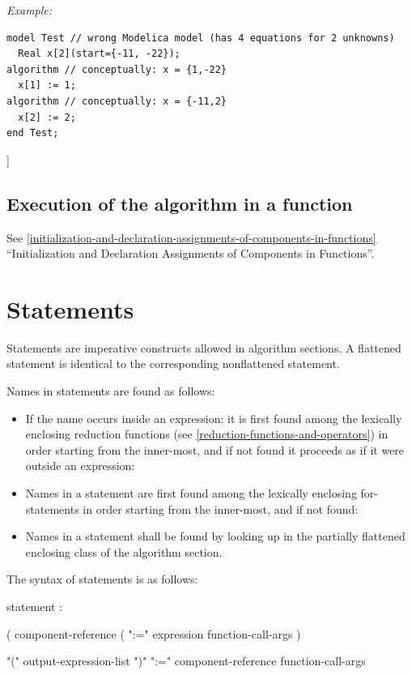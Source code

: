 \documentclass[10pt,a4paper]{report}
\def\doublelabel#1{\label{#1}\hypertarget{#1}{}}
\begin{document}
\emph{Example:}

\begin{lstlisting}[language=modelica]
model Test // wrong Modelica model (has 4 equations for 2 unknowns)
  Real x[2](start={-11, -22});
algorithm // conceptually: x = {1,-22}
  x[1] := 1;
algorithm // conceptually: x = {-11,2}
  x[2] := 2;
end Test;
\end{lstlisting}
{]}

\subsection{Execution of the algorithm in a function}\doublelabel{execution-of-the-algorithm-in-a-function}

See \ref{initialization-and-declaration-assignments-of-components-in-functions} ``Initialization and Declaration Assignments of
Components in Functions''.

\section{Statements}\doublelabel{statements}

Statements are imperative constructs allowed in algorithm sections. A
flattened statement is identical to the corresponding nonflattened
statement.

Names in statements are found as follows:

\begin{itemize}
\item
  If the name occurs inside an expression: it is first found among the
  lexically enclosing reduction functions (see \ref{reduction-functions-and-operators}) in order
  starting from the inner-most, and if not found it proceeds as if it
  were outside an expression:
\item
  Names in a statement are first found among the lexically enclosing
  for-statements in order starting from the inner-most, and if not
  found:
\item
  Names in a statement shall be found by looking up in the partially
  flattened enclosing class of the algorithm section.
\end{itemize}

The syntax of statements is as follows:

statement :

( component-reference ( ":=" expression \textbar{} function-call-args )

\textbar{} "(" output-expression-list ")" ":=" component-reference
function-call-args
\end{document}
